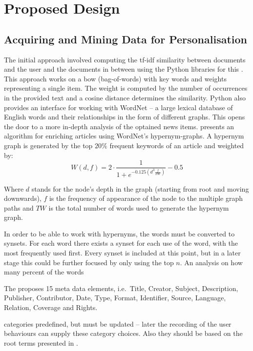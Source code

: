 \chapter{Proposed Design} %
\label{ch:design}

\section{Acquiring and Mining Data for Personalisation}

The initial approach involved computing the tf-idf similarity between documents and the user and the documents in between using the Python libraries for this \cite{NLTK}. This approach works on a bow (bag-of-words) with key words and weights representing a single item. The weight is computed by the number of occurrences in the provided text and a cosine distance determines the similarity. Python also provides an interface for working with WordNet -- a large lexical database of English words and their relationships in the form of different graphs. This opens the door to a more in-depth analysis of the optained news items. \cite{116262780379.pdf} presents an algorithm for enriching articles using WordNet's hypernym-graphs. A hypernym graph is generated by the top $20\%$ frequent keywords of an article and weighted by:
$$W(d, f) = 2 \cdot \frac{1}{1+e^{-0.125(d^3\frac{f}{TW})}}-0.5$$

Where $d$ stands for the node's depth in the graph (starting from root and moving downwards), $f$ is the frequency of appearance of the node to the multiple graph paths and $TW$ is the total number of words used to generate the hypernym graph.

In order to be able to work with hypernyms, the words must be converted to synsets. For each word there exists a synset for each use of the word, with the most frequently used first. Every synset is included at this point, but in a later stage this could be further focused by only using the top $n$. An analysis on how many percent of the words

The \cite{DCMI} proposes 15 meta data elements, i.e.\ Title, Creator, Subject, Description, Publisher, Contributor, Date, Type, Format, Identifier, Source, Language, Relation, Coverage and Rights.

categories predefined, but must be updated -- later the recording of the user behaviours can supply these category choices. Also they should be based on the root terms presented in \cite{10-1-1-19-5583}.

